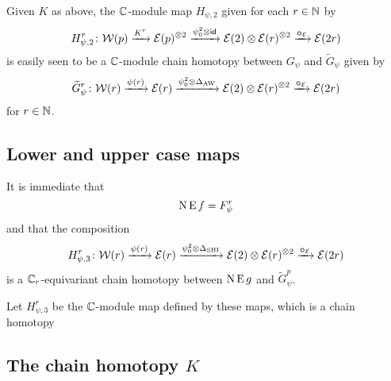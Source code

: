 Given $K$ as above, the $\mathbb{C}$-module map $H_{\psi,2}$ given for each $r \in \mathbb{N}$ by
\[
H_{\psi,2}^r \colon \mathcal{W}(p) \xrightarrow{K^r} \mathcal{E}(p)^{\otimes 2} \xrightarrow{\psi^2_0 \otimes \mathsf{id}} \mathcal{E}(2) \otimes \mathcal{E}(r)^{\otimes 2} \xrightarrow{\bm{\circ}_{\mathcal{E}}} \mathcal{E}(2r)
\]
is easily seen to be a $\mathbb{C}$-module chain homotopy between $G_\psi$ and $\widetilde G_\psi$ given by
\[
\widetilde G_\psi^r \colon \mathcal{W}(r) \xrightarrow{\psi(r)} \mathcal{E}(r) \xrightarrow{\psi^2_0 \otimes \Delta_{\operatorname{AW}}} \mathcal{E}(2) \otimes \mathcal{E}(r)^{\otimes 2} \xrightarrow{\bm{\circ}_{\mathcal{E}}} \mathcal{E}(2r)
\]
for $r \in \mathbb{N}$.

\subsection{Lower and upper case maps}

It is immediate that
\[
\operatorname{N}\operatorname{E} f = F_\psi^r
\]
and that the composition
\[
H_{\psi,3}^r \colon \mathcal{W}(r) \xrightarrow{\psi(r)} \mathcal{E}(r) \xrightarrow{\psi^2_0 \otimes \Delta_{\mathrm{SHI}}} \mathcal{E}(2) \otimes \mathcal{E}(r)^{\otimes 2} \xrightarrow{\bm{\circ}_{\mathcal{E}}} \mathcal{E}(2r)
\]
is a $\mathbb{C}_r$-equivariant chain homotopy between $\operatorname{N}\operatorname{E} g$ and $\widetilde G_\psi^p$.

Let $H_{\psi,3}^r$ be the $\mathbb{C}$-module map defined by these maps, which is a chain homotopy

\subsection{The chain homotopy $K$}

